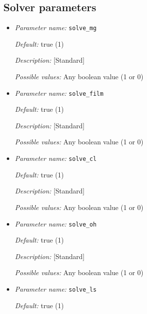 \subsection{Solver parameters}
\label{parameters:sovler}

\begin{itemize}
\item {\it Parameter name:} {\tt solve\_mg}
\label{parameters:solve_mg}


{\it Default:} true (1)

{\it Description:} [Standard] 

{\it Possible values:} Any boolean value (1 or 0)


\item {\it Parameter name:} {\tt solve\_film}
\label{parameters:solve_film}


{\it Default:} true (1)

{\it Description:} [Standard] 

{\it Possible values:} Any boolean value (1 or 0)


\item {\it Parameter name:} {\tt solve\_cl}
\label{parameters:solve_cl}


{\it Default:} true (1)

{\it Description:} [Standard] 

{\it Possible values:} Any boolean value (1 or 0)


\item {\it Parameter name:} {\tt solve\_oh}
\label{parameters:solve_oh}


{\it Default:} true (1)

{\it Description:} [Standard] 

{\it Possible values:} Any boolean value (1 or 0)


\item {\it Parameter name:} {\tt solve\_ls}
\label{parameters:solve_ls}


{\it Default:} true (1)


\end{itemize}
